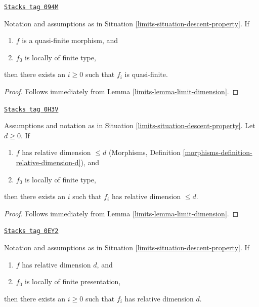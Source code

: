 \begin{lemma}
\label{limits-lemma-descend-quasi-finite}
\href{https://stacks.math.columbia.edu/tag/094M}{\texttt{Stacks tag 094M}}

Notation and assumptions as in Situation \ref{limits-situation-descent-property}.
If
\begin{enumerate}
\item $f$ is a quasi-finite morphism, and
\item $f_0$ is locally of finite type,
\end{enumerate}
then there exists an $i \geq 0$ such that $f_i$ is quasi-finite.
\end{lemma}

\begin{proof}

Follows immediately from Lemma \ref{limits-lemma-limit-dimension}.
\end{proof}

\begin{lemma}
\label{limits-lemma-eventually-relative-dimension}
\href{https://stacks.math.columbia.edu/tag/0H3V}{\texttt{Stacks tag 0H3V}}

Assumptions and notation as in Situation \ref{limits-situation-descent-property}.
Let $d \geq 0$. If
\begin{enumerate}
\item $f$ has relative dimension $\leq d$
(Morphisms, Definition \ref{morphisms-definition-relative-dimension-d}), and
\item $f_0$ is locally of finite type,
\end{enumerate}
then there exists an $i$ such that $f_i$ has relative dimension $\leq d$.
\end{lemma}

\begin{proof}

Follows immediately from Lemma \ref{limits-lemma-limit-dimension}.
\end{proof}

\begin{lemma}
\label{limits-lemma-descend-dimension-d}
\href{https://stacks.math.columbia.edu/tag/0EY2}{\texttt{Stacks tag 0EY2}}

Notation and assumptions as in Situation \ref{limits-situation-descent-property}.
If
\begin{enumerate}
\item $f$ has relative dimension $d$, and
\item $f_0$ is locally of finite presentation,
\end{enumerate}
then there exists an $i \geq 0$ such that $f_i$
has relative dimension $d$.
\end{lemma}

